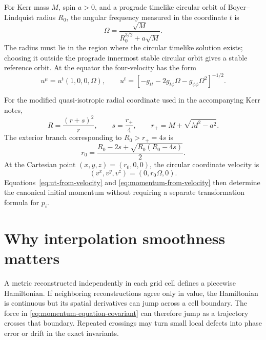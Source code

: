 \documentclass[11pt]{article}
\newcommand{\RBL}{R}
\begin{document}
For Kerr mass \(M\), spin \(a>0\), and a prograde timelike circular orbit of
Boyer--Lindquist radius \(\RBL_0\), the angular frequency measured in the
coordinate \(t\) is
\begin{equation}
 \Omega=\frac{\sqrt{M}}{\RBL_0^{3/2}+a\sqrt{M}}.
 \label{eq:circular-frequency}
\end{equation}
The radius must lie in the region where the circular timelike solution exists;
choosing it outside the prograde innermost stable circular orbit gives a stable
reference orbit.
At the equator the four-velocity has the form
\begin{equation}
 u^\mu=u^t(1,0,0,\Omega),
 \qquad
 u^t=\left[-g_{tt}-2g_{t\phi}\Omega
                 -g_{\phi\phi}\Omega^2\right]^{-1/2}.
 \label{eq:circular-four-velocity}
\end{equation}

For the modified quasi-isotropic radial coordinate used in the accompanying
Kerr notes,
\begin{equation}
 \RBL=\frac{(r+s)^2}{r},
 \qquad s=\frac{r_+}{4},
 \qquad r_+=M+\sqrt{M^2-a^2}.
 \label{eq:les-map}
\end{equation}
The exterior branch corresponding to \(\RBL_0>r_+=4s\) is
\begin{equation}
 r_0=\frac{\RBL_0-2s+\sqrt{\RBL_0(\RBL_0-4s)}}{2}.
 \label{eq:les-inverse}
\end{equation}
At the Cartesian point \((x,y,z)=(r_0,0,0)\), the circular coordinate velocity
is
\begin{equation}
 (v^x,v^y,v^z)=(0,r_0\Omega,0).
 \label{eq:circular-cartesian-velocity}
\end{equation}
Equations~\eqref{eq:ut-from-velocity} and
\eqref{eq:momentum-from-velocity} then determine the canonical initial
momentum without requiring a separate transformation formula for \(p_i\).

\section{Why interpolation smoothness matters}

A metric reconstructed independently in each grid cell defines a piecewise
Hamiltonian.  If neighboring reconstructions agree only in value, the
Hamiltonian is continuous but its spatial derivatives can jump across a cell
boundary.  The force in \cref{eq:momentum-equation-covariant} can therefore
jump as a trajectory crosses that boundary.  Repeated crossings may turn
small local defects into phase error or drift in the exact invariants.
\end{document}

